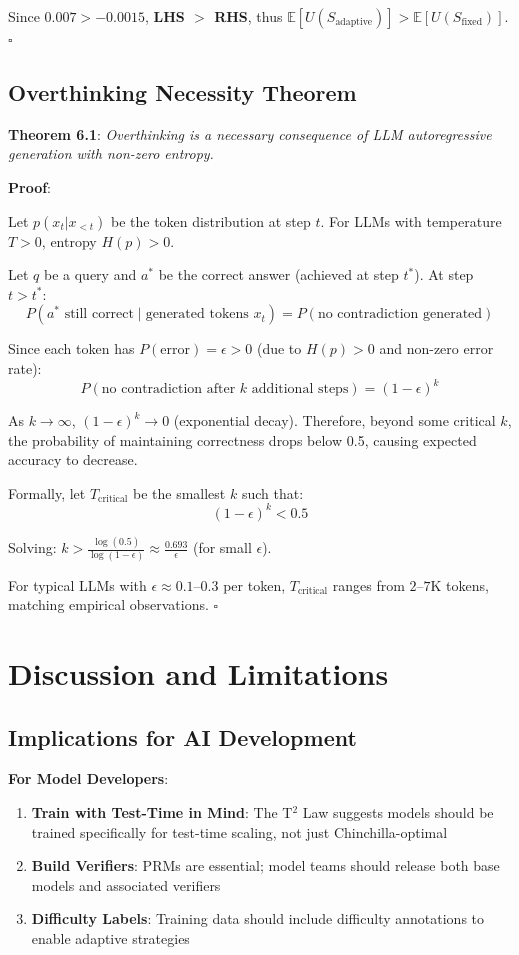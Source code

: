 \documentclass[10pt,preprint]{neurips_2024}
\begin{document}
Since $0.007 > -0.0015$, \textbf{LHS $>$ RHS}, thus $\mathbb{E}[U(S_{\text{adaptive}})] > \mathbb{E}[U(S_{\text{fixed}})]$. $\square$

\subsection{Overthinking Necessity Theorem}

\textbf{Theorem 6.1}: \textit{Overthinking is a necessary consequence of LLM autoregressive generation with non-zero entropy.}

\textbf{Proof}:

Let $p(x_t | x_{<t})$ be the token distribution at step $t$. For LLMs with temperature $T > 0$, entropy $H(p) > 0$.

Let $q$ be a query and $a^*$ be the correct answer (achieved at step $t^*$). At step $t > t^*$:
$$P(a^* \text{ still correct} \mid \text{generated tokens } x_t) = P(\text{no contradiction generated})$$

Since each token has $P(\text{error}) = \epsilon > 0$ (due to $H(p) > 0$ and non-zero error rate):
$$P(\text{no contradiction after } k \text{ additional steps}) = (1 - \epsilon)^k$$

As $k \rightarrow \infty$, $(1 - \epsilon)^k \rightarrow 0$ (exponential decay). Therefore, beyond some critical $k$, the probability of maintaining correctness drops below 0.5, causing expected accuracy to decrease.

Formally, let $T_{\text{critical}}$ be the smallest $k$ such that:
$$(1 - \epsilon)^k < 0.5$$

Solving: $k > \frac{\log(0.5)}{\log(1 - \epsilon)} \approx \frac{0.693}{\epsilon}$ (for small $\epsilon$).

For typical LLMs with $\epsilon \approx 0.1\text{--}0.3$ per token, $T_{\text{critical}}$ ranges from $2\text{--}7$K tokens, matching empirical observations. $\square$

\section{Discussion and Limitations}

\subsection{Implications for AI Development}

\textbf{For Model Developers}:
\begin{enumerate}
    \item \textbf{Train with Test-Time in Mind}: The T$^2$ Law suggests models should be trained specifically for test-time scaling, not just Chinchilla-optimal
    \item \textbf{Build Verifiers}: PRMs are essential; model teams should release both base models and associated verifiers
    \item \textbf{Difficulty Labels}: Training data should include difficulty annotations to enable adaptive strategies
\end{enumerate}
\end{document}
